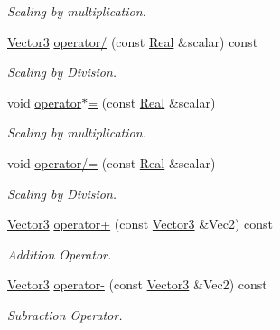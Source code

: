 \begin{DoxyCompactItemize}
\begin{DoxyCompactList}\small\item\em Scaling by multiplication. \item\end{DoxyCompactList}\item 
\hyperlink{classphys_1_1Vector3}{Vector3} \hyperlink{classphys_1_1Vector3_a4bb5377ad78c299b40a8bc9fb66a902f}{operator/} (const \hyperlink{namespacephys_af7eb897198d265b8e868f45240230d5f}{Real} \&scalar) const 
\begin{DoxyCompactList}\small\item\em Scaling by Division. \item\end{DoxyCompactList}\item 
void \hyperlink{classphys_1_1Vector3_ae04a2cdca40ac24180d6fb62babb34d7}{operator$\ast$=} (const \hyperlink{namespacephys_af7eb897198d265b8e868f45240230d5f}{Real} \&scalar)
\begin{DoxyCompactList}\small\item\em Scaling by multiplication. \item\end{DoxyCompactList}\item 
void \hyperlink{classphys_1_1Vector3_ae16bc8ff2f9897b52c36655a8ba8a1be}{operator/=} (const \hyperlink{namespacephys_af7eb897198d265b8e868f45240230d5f}{Real} \&scalar)
\begin{DoxyCompactList}\small\item\em Scaling by Division. \item\end{DoxyCompactList}\item 
\hyperlink{classphys_1_1Vector3}{Vector3} \hyperlink{classphys_1_1Vector3_ab9799d4796f3750d44f591986d78e436}{operator+} (const \hyperlink{classphys_1_1Vector3}{Vector3} \&Vec2) const 
\begin{DoxyCompactList}\small\item\em Addition Operator. \item\end{DoxyCompactList}\item 
\hyperlink{classphys_1_1Vector3}{Vector3} \hyperlink{classphys_1_1Vector3_aed320f9ac1374c0955a20aef50c05751}{operator-\/} (const \hyperlink{classphys_1_1Vector3}{Vector3} \&Vec2) const 
\begin{DoxyCompactList}\small\item\em Subraction Operator. \item\end{DoxyCompactList}\item 

\end{DoxyCompactItemize}
